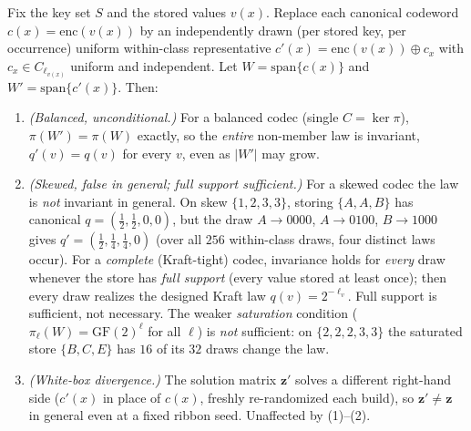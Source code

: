 \documentclass[sigconf,nonacm,anonymous,balance=false]{acmart}
\newcommand{\enc}{\mathrm{enc}}
\newcommand{\GF}{\mathrm{GF}(2)}
\newcommand{\spn}{\mathrm{span}}
\newcommand{\W}{W}                          %
\newcommand{\proj}{\pi}                     %
\newcommand{\bz}{\mathbf{z}}                %
\newcommand{\cx}{c(x)}                      %
\begin{document}
\begin{theorem}
\label{thm:randenc}
Fix the key set $S$ and the stored values $v(x)$. Replace each canonical codeword
$\cx = \enc(v(x))$ by an independently drawn (per stored key, per occurrence) uniform
within-class representative $c'(x) = \enc(v(x)) \oplus c_x$ with $c_x \in C_{\ell_{v(x)}}$
uniform and independent. Let $\W = \spn\{\cx\}$ and $\W' = \spn\{c'(x)\}$. Then:
\begin{enumerate}
  \item \emph{(Balanced, unconditional.)} For a balanced codec (single $C = \ker\proj$),
  $\proj(\W') = \proj(\W)$ exactly, so the \emph{entire} non-member law is invariant,
  $q'(v) = q(v)$ for every $v$, even as $|\W'|$ may grow.
  \item \emph{(Skewed, false in general; full support sufficient.)} For a skewed codec the law
  is \emph{not} invariant in general. On skew $\{1,2,3,3\}$, storing $\{A,A,B\}$ has canonical
  $q = (\tfrac12,\tfrac12,0,0)$, but the draw $A \to 0000$, $A \to 0100$, $B \to 1000$ gives
  $q' = (\tfrac12,\tfrac14,\tfrac14,0)$ (over all $256$ within-class draws, four distinct laws
  occur). For a \emph{complete} (Kraft-tight) codec, invariance holds for \emph{every} draw
  whenever the store has \emph{full support} (every value stored at least once); then every draw
  realizes the designed Kraft law $q(v) = 2^{-\ell_v}$. Full support is sufficient, not necessary.
  The weaker \emph{saturation} condition ($\proj_\ell(\W) = \GF^\ell$ for all $\ell$) is
  \emph{not} sufficient: on $\{2,2,2,3,3\}$ the saturated store $\{B,C,E\}$ has $16$ of its $32$
  draws change the law.
  \item \emph{(White-box divergence.)} The solution matrix $\bz'$ solves a different
  right-hand side ($c'(x)$ in place of $\cx$, freshly re-randomized each build), so
  $\bz' \ne \bz$ in general even at a fixed ribbon seed. Unaffected by (1)--(2).
\end{enumerate}
\end{theorem}
\end{document}

